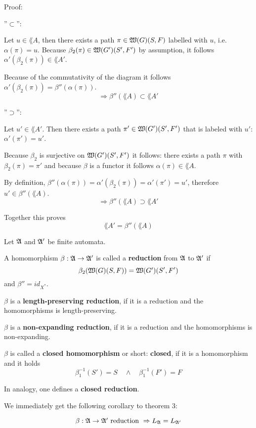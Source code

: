 Proof: 

''$\subset$'':

Let $u \in \lang{A}$, then there exists a path $\pi \in \mbox{$\mathfrak{W}(G)$}(S, F)$
labelled with $u$, i.e. $\alpha(\pi) = u$. Because $\beta_2(\pi) \in
\mbox{$\mathfrak{W}(G')$}(S',F')$ by assumption, it follows $\alpha'(\beta_2(\pi)) \in
\lang{A'}$.

Because of the commutativity of the diagram it follows $ \alpha'(\beta_2(\pi))
= \beta''(\alpha(\pi))$.
\[ \Rightarrow \beta''(\lang{A}) \subset \lang{A'} \]

''$\supset$'':

Let $u' \in \lang{A'}$. Then there exists a path $\pi' \in \mbox{$\mathfrak{W}(G')$}(S', F')$
that is labeled with $u'$: $\alpha'(\pi') = u'$.

Because $\beta_2$ is surjective on $\mbox{$\mathfrak{W}(G')$}(S', F')$ it follows: there
exists a path $\pi$ with $\beta_2(\pi) = \pi'$ and because $\beta$ is a functor
it follows $\alpha(\pi) \in \lang{A}$.

By definition, $\beta''(\alpha(\pi)) = \alpha'(\beta_2(\pi)) = \alpha'(\pi') =
u'$, therefore $u' \in \beta''(\lang{A})$.
\[ \Rightarrow  \beta''(\lang{A}) \supset \lang{A'} \]

Together this proves \[ \lang{A'} = \beta''(\lang{A}) \]

\begin{definition}
Let $\mbox{$\mathfrak{A}$}$ and $\mbox{$\mathfrak{A'}$}$ be finite automata.

A homomorphism $\beta : \mbox{$\mathfrak{A \to \mbox{$\mathfrak{A'}$}}$}$ is called a {\bf reduction} from
$\mbox{$\mathfrak{A}$}$ to $\mbox{$\mathfrak{A'}$}$ if \[ \beta_2(\mbox{$\mathfrak{W}(G)$}(S, F)) = \mbox{$\mathfrak{W}(G')$}(S', F') \]
and $\beta'' = id_{X^*}$.

$\beta$ is a {\bf length-preserving reduction}, if it is a reduction and the
homomorphisms is length-preserving.

$\beta$ is a {\bf non-expanding reduction}, if it is a
reduction and the homomorphisms is non-expanding.

$\beta$	 is called a {\bf closed homomorphism} or short: {\bf closed}, if it is
a homomorphism and it holds \[ \beta_1^{-1}(S') = S \quad\wedge\quad
\beta_1^{-1}(F') = F
\]

In analogy, one defines a {\bf closed reduction}.
\end{definition}

We immediately get the following corollary to theorem 3:

\begin{corollary}
\[ \beta : \mbox{$\mathfrak{A}$} \to \mbox{$\mathfrak{A'}$} \mbox{ reduction } \Rightarrow \mbox{$L_{\mathfrak{A}}$} =
\mbox{$L_{\mathfrak{A'}}$} \]
\end{corollary}

